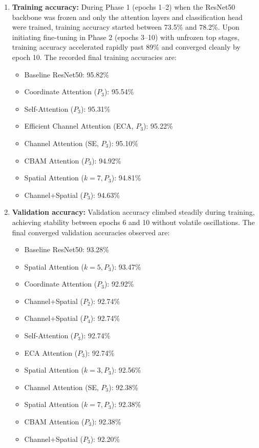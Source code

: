 \documentclass[10pt]{article}
\begin{document}
\begin{enumerate}
\item \textbf{Training accuracy:}
During Phase 1 (epochs 1--2) when the ResNet50 backbone was frozen and only the attention layers and classification head were trained, training accuracy started between 73.5\% and 78.2\%. Upon initiating fine-tuning in Phase 2 (epochs 3--10) with unfrozen top stages, training accuracy accelerated rapidly past 89\% and converged cleanly by epoch 10. The recorded final training accuracies are:
\begin{itemize}
\item Baseline ResNet50: 95.82\%
\item Coordinate Attention ($P_3$): 95.54\%
\item Self-Attention ($P_3$): 95.31\%
\item Efficient Channel Attention (ECA, $P_3$): 95.22\%
\item Channel Attention (SE, $P_3$): 95.10\%
\item CBAM Attention ($P_3$): 94.92\%
\item Spatial Attention ($k=7, P_3$): 94.81\%
\item Channel+Spatial ($P_3$): 94.63\%
\end{itemize}

\item \textbf{Validation accuracy:}
Validation accuracy climbed steadily during training, achieving stability between epochs 6 and 10 without volatile oscillations. The final converged validation accuracies observed are:
\begin{itemize}
\item Baseline ResNet50: 93.28\%
\item Spatial Attention ($k=5, P_3$): 93.47\%
\item Coordinate Attention ($P_3$): 92.92\%
\item Channel+Spatial ($P_2$): 92.74\%
\item Channel+Spatial ($P_4$): 92.74\%
\item Self-Attention ($P_3$): 92.74\%
\item ECA Attention ($P_3$): 92.74\%
\item Spatial Attention ($k=3, P_3$): 92.56\%
\item Channel Attention (SE, $P_3$): 92.38\%
\item Spatial Attention ($k=7, P_3$): 92.38\%
\item CBAM Attention ($P_3$): 92.38\%
\item Channel+Spatial ($P_3$): 92.20\%
\end{itemize}


\end{enumerate}
\end{document}
